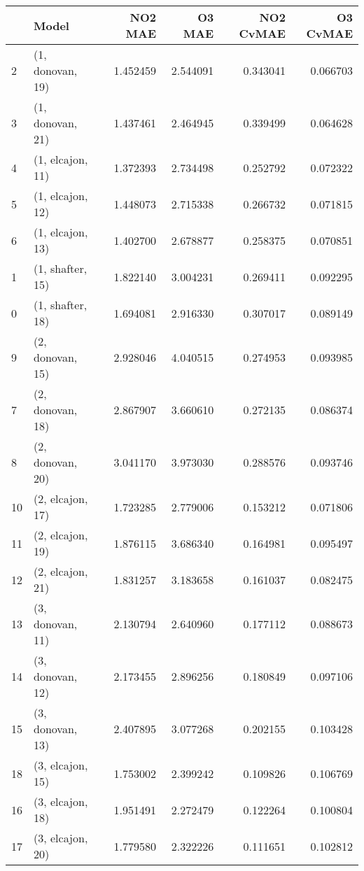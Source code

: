 \begin{tabular}{llrrrr}
\toprule
{} &             Model &   NO2 MAE &    O3 MAE &  NO2 CvMAE &  O3 CvMAE \\
\midrule
2  &  (1, donovan, 19) &  1.452459 &  2.544091 &   0.343041 &  0.066703 \\
3  &  (1, donovan, 21) &  1.437461 &  2.464945 &   0.339499 &  0.064628 \\
4  &  (1, elcajon, 11) &  1.372393 &  2.734498 &   0.252792 &  0.072322 \\
5  &  (1, elcajon, 12) &  1.448073 &  2.715338 &   0.266732 &  0.071815 \\
6  &  (1, elcajon, 13) &  1.402700 &  2.678877 &   0.258375 &  0.070851 \\
1  &  (1, shafter, 15) &  1.822140 &  3.004231 &   0.269411 &  0.092295 \\
0  &  (1, shafter, 18) &  1.694081 &  2.916330 &   0.307017 &  0.089149 \\
9  &  (2, donovan, 15) &  2.928046 &  4.040515 &   0.274953 &  0.093985 \\
7  &  (2, donovan, 18) &  2.867907 &  3.660610 &   0.272135 &  0.086374 \\
8  &  (2, donovan, 20) &  3.041170 &  3.973030 &   0.288576 &  0.093746 \\
10 &  (2, elcajon, 17) &  1.723285 &  2.779006 &   0.153212 &  0.071806 \\
11 &  (2, elcajon, 19) &  1.876115 &  3.686340 &   0.164981 &  0.095497 \\
12 &  (2, elcajon, 21) &  1.831257 &  3.183658 &   0.161037 &  0.082475 \\
13 &  (3, donovan, 11) &  2.130794 &  2.640960 &   0.177112 &  0.088673 \\
14 &  (3, donovan, 12) &  2.173455 &  2.896256 &   0.180849 &  0.097106 \\
15 &  (3, donovan, 13) &  2.407895 &  3.077268 &   0.202155 &  0.103428 \\
18 &  (3, elcajon, 15) &  1.753002 &  2.399242 &   0.109826 &  0.106769 \\
16 &  (3, elcajon, 18) &  1.951491 &  2.272479 &   0.122264 &  0.100804 \\
17 &  (3, elcajon, 20) &  1.779580 &  2.322226 &   0.111651 &  0.102812 \\
\bottomrule
\end{tabular}
